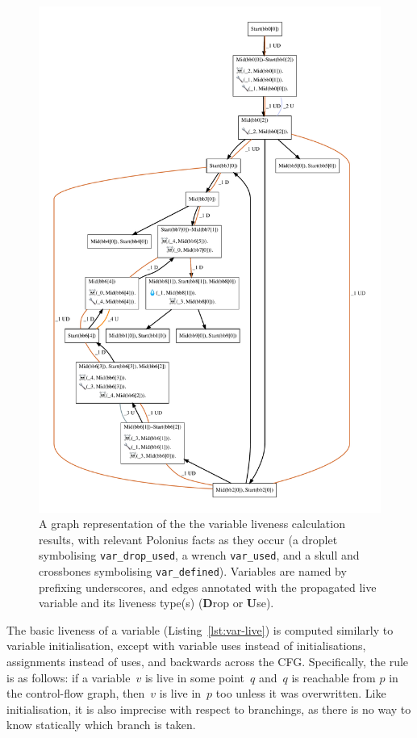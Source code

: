 \documentclass[11pt,a4paper,twoside,openany,draft]{report}
\newcommand{\InDatalog}[1]{\texttt{#1}}
\begin{document}
\begin{figure}
  \includegraphics[width=0.9\linewidth]{Graphs/liveness.pdf}
  \caption[MIR Fragment with Inputs and Outputs of the Liveness Analysis]{A
    graph representation of the the variable liveness calculation results, with
    relevant Polonius facts as they occur (a droplet symbolising
    \InDatalog{var_drop_used}, a wrench \InDatalog{var_used}, and a skull and
    crossbones symbolising \InDatalog{var_defined}). Variables are named by
    prefixing underscores, and edges annotated with the propagated live variable
    and its liveness type(s) (\textbf{D}rop or \textbf{U}se).}
  \label{fig:liveness-graph}
\end{figure}

The basic liveness of a variable (Listing~\ref{lst:var-live}) is computed
similarly to variable initialisation, except with variable uses instead of
initialisations, assignments instead of uses, and backwards across the CFG.
Specifically, the rule is as follows: if a variable~$v$ is live in some
point~$q$ and~$q$ is reachable from $p$ in the control-flow graph, then~$v$ is
live in~$p$ too unless it was overwritten. Like initialisation, it is also
imprecise with respect to branchings, as there is no way to know statically
which branch is taken.
\end{document}
